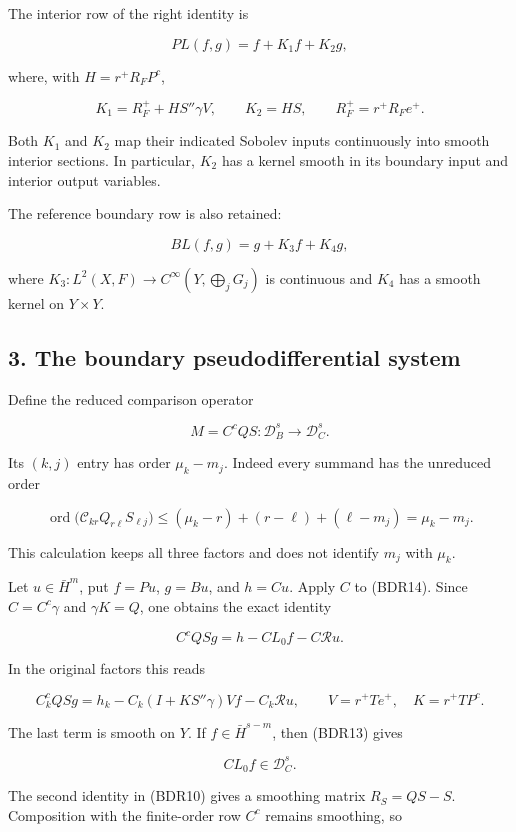 \documentclass[
  11pt,
]{article}
\begin{document}
The interior row of the right identity is

\[
 PL(f,g)=f+K_1f+K_2g,
 \tag{BDR16}
\]

where, with \(H=r^+R_FP^c\),

\[
 K_1=R_F^++HS''\gamma V,\qquad
 K_2=HS,\qquad R_F^+=r^+R_Fe^+.
 \tag{BDR17}
\]

Both \(K_1\) and \(K_2\) map their indicated Sobolev inputs continuously
into smooth interior sections. In particular, \(K_2\) has a kernel
smooth in its boundary input and interior output variables.

The reference boundary row is also retained:

\[
 BL(f,g)=g+K_3f+K_4g,
 \tag{BDR18}
\]

where \(K_3:L^2(X,F)\to C^\infty(Y,\bigoplus_jG_j)\) is continuous and
\(K_4\) has a smooth kernel on \(Y\times Y\).

\subsection{3. The boundary pseudodifferential
system}\label{the-boundary-pseudodifferential-system}

Define the reduced comparison operator

\[
 M=C^cQS:\mathcal D_B^s\longrightarrow\mathcal D_C^s.
 \tag{BDR19}
\]

Its \((k,j)\) entry has order \(\mu_k-m_j\). Indeed every summand has
the unreduced order

\[
 \operatorname{ord}\bigl(\mathcal C_{kr}Q_{r\ell}S_{\ell j}\bigr)
 \leq(\mu_k-r)+(r-\ell)+(\ell-m_j)
 =\mu_k-m_j.
 \tag{BDR20}
\]

This calculation keeps all three factors and does not identify \(m_j\)
with \(\mu_k\).

Let \(u\in\bar H^m\), put \(f=Pu\), \(g=Bu\), and \(h=Cu\). Apply \(C\)
to (BDR14). Since \(C=C^c\gamma\) and \(\gamma K=Q\), one obtains the
exact identity

\[
 C^cQSg
 =h-CL_0f-C\mathcal Ru.
 \tag{BDR21}
\]

In the original factors this reads

\[
 C_k^cQSg
 =h_k-C_k(I+KS''\gamma)Vf-C_k\mathcal Ru,
 \qquad V=r^+Te^+,\quad K=r^+TP^c.
 \tag{BDR22}
\]

The last term is smooth on \(Y\). If \(f\in\bar H^{s-m}\), then (BDR13)
gives

\[
 CL_0f\in\mathcal D_C^s.
 \tag{BDR23}
\]

The second identity in (BDR10) gives a smoothing matrix \(R_S=QS-S\).
Composition with the finite-order row \(C^c\) remains smoothing, so
\end{document}
